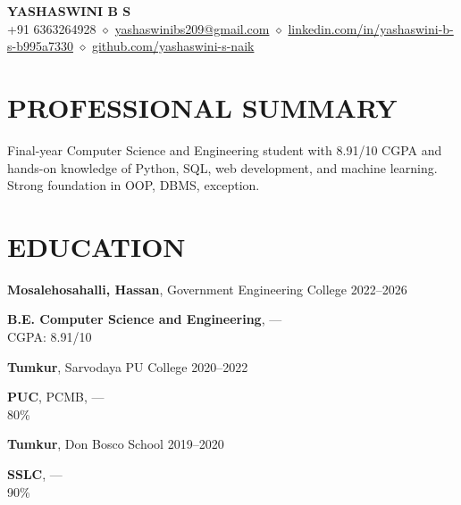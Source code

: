 \documentclass[9.5pt,a4paper]{extarticle}
\begin{document}
\begin{center}
{\Large \textbf{YASHASWINI B S}} \\ \vspace{2pt}
+91 6363264928 $\diamond$ \href{mailto:yashaswinibs209@gmail.com}{yashaswinibs209@gmail.com} $\diamond$ \href{https://linkedin.com/in/yashaswini-b-s-b995a7330}{linkedin.com/in/yashaswini-b-s-b995a7330} $\diamond$ \href{https://github.com/yashaswini-s-naik}{github.com/yashaswini-s-naik}
\end{center}

\section*{PROFESSIONAL SUMMARY}
Final-year Computer Science and Engineering student with 8.91/10 CGPA and hands-on knowledge of Python, SQL, web development, and machine learning. Strong foundation in OOP, DBMS, exception.

\section*{EDUCATION}
\noindent \textbf{Mosalehosahalli, Hassan}, Government Engineering College \hfill 2022–2026 \\ \vspace{4pt}

\noindent \textbf{B.E. Computer Science and Engineering}, — \\
\null \hfill CGPA: 8.91/10 \vspace{4pt}

\noindent \textbf{Tumkur}, Sarvodaya PU College \hfill 2020–2022 \\ \vspace{4pt}

\noindent \textbf{PUC}, PCMB, — \\
\null \hfill 80\% \vspace{4pt}

\noindent \textbf{Tumkur}, Don Bosco School \hfill 2019–2020 \\ \vspace{4pt}

\noindent \textbf{SSLC}, — \\
\null \hfill 90\% \vspace{4pt}


\end{document}
